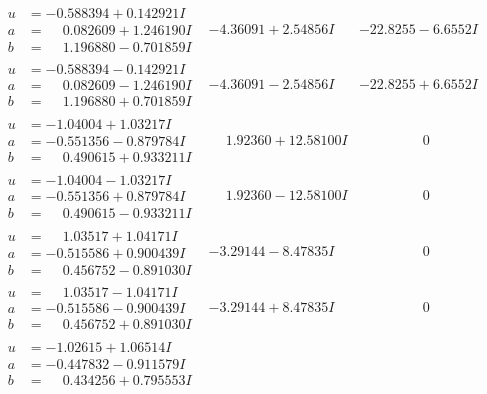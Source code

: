 \documentclass[1p]{elsarticle_modified}
\theoremstyle{definition}
\begin{document}
$$\begin{array}{c|c|c}
\begin{aligned}
u &= -0.588394 + 0.142921 I \\
a &= \phantom{-}0.082609 + 1.246190 I \\
b &= \phantom{-}1.196880 - 0.701859 I\end{aligned}
 & -4.36091 + 2.54856 I & -22.8255 - 6.6552 I \\ \hline\begin{aligned}
u &= -0.588394 - 0.142921 I \\
a &= \phantom{-}0.082609 - 1.246190 I \\
b &= \phantom{-}1.196880 + 0.701859 I\end{aligned}
 & -4.36091 - 2.54856 I & -22.8255 + 6.6552 I \\ \hline\begin{aligned}
u &= -1.04004 + 1.03217 I \\
a &= -0.551356 - 0.879784 I \\
b &= \phantom{-}0.490615 + 0.933211 I\end{aligned}
 & \phantom{-}1.92360 + 12.58100 I & \phantom{-0.000000 } 0 \\ \hline\begin{aligned}
u &= -1.04004 - 1.03217 I \\
a &= -0.551356 + 0.879784 I \\
b &= \phantom{-}0.490615 - 0.933211 I\end{aligned}
 & \phantom{-}1.92360 - 12.58100 I & \phantom{-0.000000 } 0 \\ \hline\begin{aligned}
u &= \phantom{-}1.03517 + 1.04171 I \\
a &= -0.515586 + 0.900439 I \\
b &= \phantom{-}0.456752 - 0.891030 I\end{aligned}
 & -3.29144 - 8.47835 I & \phantom{-0.000000 } 0 \\ \hline\begin{aligned}
u &= \phantom{-}1.03517 - 1.04171 I \\
a &= -0.515586 - 0.900439 I \\
b &= \phantom{-}0.456752 + 0.891030 I\end{aligned}
 & -3.29144 + 8.47835 I & \phantom{-0.000000 } 0 \\ \hline\begin{aligned}
u &= -1.02615 + 1.06514 I \\
a &= -0.447832 - 0.911579 I \\
b &= \phantom{-}0.434256 + 0.795553 I\end{aligned}

\end{array}$$
\end{document}
